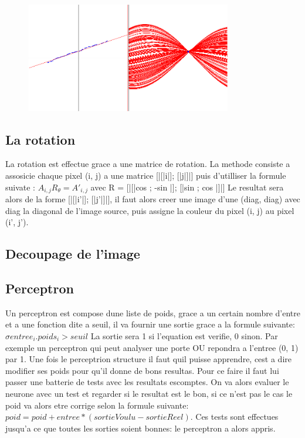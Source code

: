 \documentclass{article}
\begin{document}
\begin{figure}[hp]
\centering
\includegraphics[width=0.80\textwidth]{img/hough.png}
\end{figure}
\subsection{La rotation}
La rotation est effectue grace a une matrice de rotation. La methode consiste a assosicie chaque pixel (i, j) a une matrice [|[|i|]; [|j|]|] puis d'utilliser la formule suivate : 
$A_{i,j}R_{\theta} = A'_{i,j}$ avec R = [|[|cos \theta; -sin \theta|]; [|sin \theta; cos \theta|]|] 
Le resultat sera alors de la forme [|[|i'|]; [|j'|]|], il faut alors creer une image d'une (diag, diag) avec diag la diagonal de l'image source, puis assigne la couleur du pixel (i, j) au pixel (i', j').

\subsection{Decoupage de l'image}
\subsection{Perceptron}
Un perceptron est compose dune liste de poids, grace a un certain nombre d'entre et a une fonction dite a seuil, il va fournir une sortie grace a la formule suivante: 
$\sigma entree_{i}.poids_{i} > seuil$
 La sortie sera 1 si l'equation est verifie, 0 sinon. Par exemple un perceptron qui peut analyser une porte OU repondra a l'entree (0, 1) par 1.
Une fois le perceptrion structure il faut quil puisse apprendre, cest a dire modifier ses poids pour qu'il donne de bons resultas. Pour ce faire il faut lui passer une batterie de tests avec les resultats escomptes. On va alors evaluer le neurone avec un test et regarder si le resultat est le bon, si ce n'est pas le cas le poid va alors etre corrige selon la formule suivante: 
$poid = poid + entree*(sortieVoulu - sortieReel)$.
 Ces tests sont effectues jusqu'a ce que toutes les sorties soient bonnes: le perceptron a alors appris.
\end{document}
